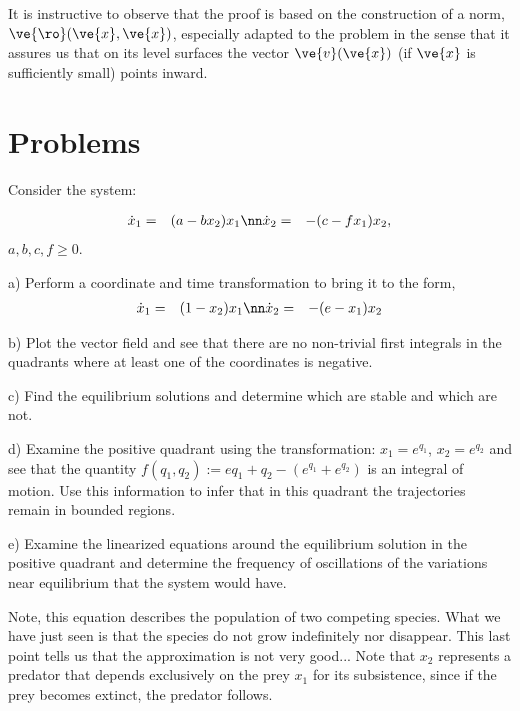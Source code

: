 It is instructive to observe that the proof is based on the construction of
a norm, $\ve{\ro}(\ve{x},\ve{x})$, especially adapted to the problem in the sense that
it assures us that on its level surfaces the vector $\ve{v}(\ve{x})$ (if $\ve{x}$ is
sufficiently small) points inward.


\section{Problems}




Consider the system:

\begin{eqnarray}
  \label{eq:Volterra_Lotka}
  \dot{x}_1 &=& (a-bx_2)x_1 \nn
  \dot{x}_2 &=& -(c-f x_1)x_2,
\end{eqnarray}
$a, b, c, f \geq 0$.

a) Perform a coordinate and time transformation to bring it to the form,
\begin{eqnarray}
  \label{eq:Volterra_Lotka_adim}
  \dot{x}_1 &=& (1 - x_2)x_1 \nn
  \dot{x}_2 &=& -(e - x_1)x_2
\end{eqnarray}
%

b) Plot the vector field and see that there are no non-trivial first integrals in the quadrants where at least one of the coordinates is negative.

c) Find the equilibrium solutions and determine which are stable and which are not.

d) Examine the positive quadrant using the transformation:
$x_1 = e^{q_1}$, $x_2 = e^{q_2}$ and see that the quantity
$f(q_1,q_2) := e q_1 + q_2 -(e^{q_1} + e^{q_2})$ is an integral
of motion. Use this information to infer that in this
quadrant the trajectories remain in bounded regions.

e) Examine the linearized equations around the equilibrium solution in the positive quadrant and determine the frequency of oscillations of the variations near equilibrium that the system would have.

Note, this equation describes the population of two competing species.
What we have just seen is that the species do not grow indefinitely nor
disappear. This last point tells us that the approximation is not
very good...
Note that $x_2$ represents a predator that depends exclusively on
the prey $x_1$ for its subsistence, since if the prey becomes extinct, the predator follows.
\epro

